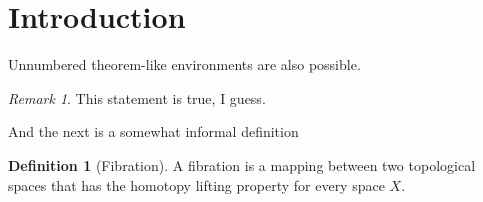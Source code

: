 \documentclass{article}
\theoremstyle{definition}
\newtheorem{definition}{Definition}[section]
\theoremstyle{remark}
\newtheorem*{remark}{Remark}
\begin{document}
	\section{Introduction}
	Unnumbered theorem-like environments are also possible.
	
	\begin{remark}
		This statement is true, I guess.
	\end{remark}
	
	And the next is a somewhat informal definition
	
	\begin{definition}[Fibration]
		A fibration is a mapping between two topological spaces that has the homotopy lifting property for every space \(X\).
	\end{definition}
\end{document}
